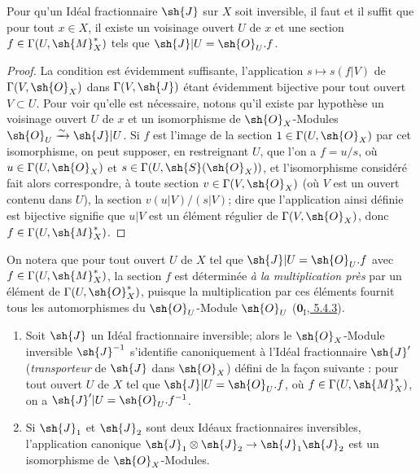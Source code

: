 \begin{proposition}[21.2.2]
\label{IV.21.2.2}
Pour qu'un Idéal fractionnaire $\sh{J}$ sur $X$ soit inversible, il faut et il suffit que pour tout $x\in X$, il existe un voisinage ouvert $U$ de $x$ et une section $f\in\Gamma(U,\sh{M}_X^*)$ tels que $\sh{J}|U=\sh{O}_U.f$.
\end{proposition}

\begin{proof}
La condition est évidemment suffisante, l'application $s\mapsto s(f|V)$ de $\Gamma(V,\sh{O}_X)$ dans $\Gamma(V,\sh{J})$ étant évidemment bijective pour tout ouvert $V\subset U$.
Pour voir qu'elle est nécessaire, notons qu'il existe par hypothèse un voisinage ouvert $U$ de $x$ et un isomorphisme de $\sh{O}_X$-Modules $\sh{O}_U\xrightarrow{\sim}\sh{J}|U$.
Si $f$ est l'image de la section $1\in\Gamma(U,\sh{O}_X)$ par cet isomorphisme, on peut supposer, en restreignant $U$, que l'on a $f=u/s$, où $u\in\Gamma(U,\sh{O}_X)$ et $s\in\Gamma(U,\sh{S}(\sh{O}_X))$, et l'isomorphisme considéré fait alors correspondre, à toute section $v\in\Gamma(V,\sh{O}_X)$ (où $V$ est un ouvert contenu dans $U$), la section $v(u|V)/(s|V)$;
dire que l'application ainsi définie est bijective signifie que $u|V$ est un élément régulier de $\Gamma(V,\sh{O}_X)$, donc $f\in\Gamma(U,\sh{M}_X^*)$.
\end{proof}

On notera que pour tout ouvert $U$ de $X$ tel que $\sh{J}|U=\sh{O}_U.f$ avec $f\in\Gamma(U,\sh{M}_X^*)$, la section $f$ est déterminée \emph{à la multiplication près} par un élément de $\Gamma(U,\sh{O}_X^*)$, puisque la
multiplication par ces éléments fournit tous les automorphismes du $\sh{O}_U$-Module $\sh{O}_U$ (\hyperref[0.5.4.3]{$\mathbf{0}_{\mathrm I}$, 5.4.3}).

\begin{corollary}[21.2.3]
\label{IV.21.2.3}
\begin{enumerate}[label=(\roman*)]
  \item Soit $\sh{J}$ un Idéal fractionnaire inversible;
  alors le $\sh{O}_X$-Module inversible $\sh{J}^{-1}$ s'identifie canoniquement à l'Idéal fractionnaire $\sh{J}'$ (\emph{transporteur} de $\sh{J}$ dans $\sh{O}_X$) défini de la façon suivante : pour tout ouvert $U$ de $X$ tel que $\sh{J}|U=\sh{O}_U.f$, où $f\in\Gamma(U,\sh{M}_X^*)$, on a $\sh{J}'|U=\sh{O}_U.f^{-1}$.
  \item Si $\sh{J}_1$ et $\sh{J}_2$ sont deux Idéaux fractionnaires inversibles, l'application canonique $\sh{J}_1\otimes\sh{J}_2\to\sh{J}_1\sh{J}_2$ est un isomorphisme de $\sh{O}_X$-Modules.
\end{enumerate}
\end{corollary}

